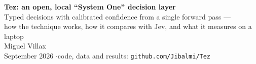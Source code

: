\documentclass[11pt,a4paper]{article}
\newcommand{\code}[1]{\texttt{#1}}
\begin{document}
\begin{center}
{\LARGE\bfseries\color{navy} Tez: an open, local ``System One'' decision layer}\\[4pt]
{\large\color{ink} Typed decisions with calibrated confidence from a single forward pass ---\\ how the technique works, how it compares with Jev, and what it measures on a laptop}\\[10pt]
{\normalsize Miguel Villax}\\[2pt]
{\small\color{slate} September 2026 \quad$\cdot$\quad code, data and results: \code{github.com/Jibalmi/Tez}}
\end{center}
\vspace{4pt}

\begin{abstract}
\noindent

\end{abstract}
\end{document}
